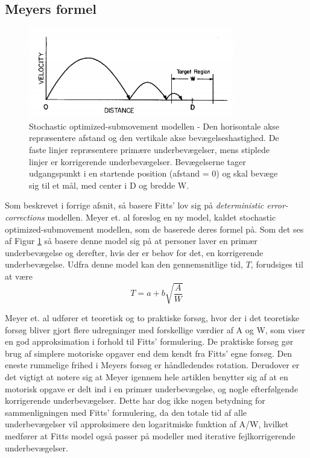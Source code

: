 \subsection*{Meyers formel}
\begin{figure}[h]
\centering
\includegraphics[scale=1.0]{billeder/MeyerTheory.png}
\caption{Stochastic optimized-submovement modellen - Den horisontale akse repræsentere afstand og den vertikale akse bevægelseshastighed. De faste linjer repræsentere primære underbevægelser, mens stiplede linjer er korrigerende underbevægelser. Bevægelserne tager udgangspunkt i en startende position (afstand = 0) og skal bevæge sig til et mål, med center i D og bredde W.}
\label{fig:MeyerTheory}
\end{figure}
Som beskrevet i forrige afsnit, så basere Fitts' lov sig på \emph{deterministic error-corrections} modellen. Meyer et. al foreslog en ny model, kaldet stochastic optimized-submovement modellen, som de baserede deres formel på\cite{meyer1988}. Som det ses af Figur \ref{fig:MeyerTheory} så basere denne model sig på at personer laver en primær underbevægelse og derefter, hvis der er behov for det, en korrigerende underbevægelse. Udfra denne model kan den gennemsnitlige tid, $T$, forudsiges til at være
\begin{equation}
\label{eq:meyer}
T = a + b \sqrt{\frac{A}{W}}
\end{equation}

Meyer et. al udfører et teoretisk og to praktiske forsøg, hvor der i det teoretiske forsøg bliver gjort flere udregninger med forskellige værdier af A og W, som viser en god approksimation i forhold til Fitts' formulering. De praktiske forsøg gør brug af simplere motoriske opgaver end dem kendt fra Fitts' egne forsøg. Den eneste rummelige frihed i Meyers forsøg er håndledendes rotation. Derudover er det vigtigt at notere sig at Meyer igennem hele artiklen benytter sig af at en motorisk opgave er delt ind i en primær underbevægelse, og nogle efterfølgende korrigerende underbevægelser. Dette har dog ikke nogen betydning for sammenligningen med Fitts’ formulering, da den totale tid af alle underbevægelser vil approksimere den logaritmiske funktion af A/W, hvilket medfører at Fitts model også passer på modeller med iterative fejlkorrigerende underbevægelser.

